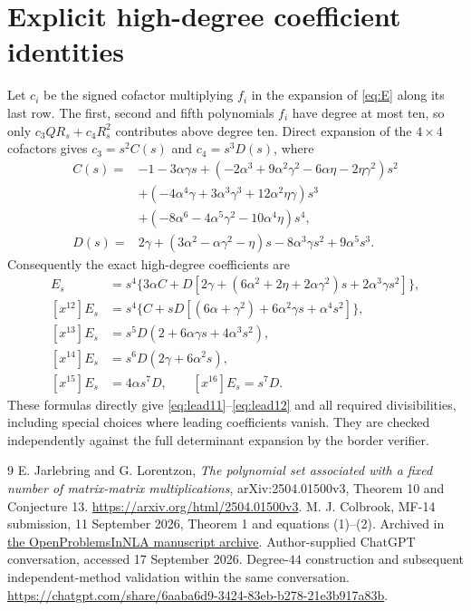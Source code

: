 \documentclass[11pt]{article}
\begin{document}
\section{Explicit high-degree coefficient identities}\label{app:cofactors}
Let $c_i$ be the signed cofactor multiplying $f_i$ in the expansion of
\eqref{eq:E} along its last row. The first, second and fifth polynomials
$f_i$ have degree at most ten, so only $c_3QR_s+c_4R_s^2$ contributes
above degree ten. Direct expansion of the $4\times4$ cofactors gives
$c_3=s^2 C(s)$ and $c_4=s^3 D(s)$, where
\begin{align*}
 C(s)={}&-1-3\alpha\gamma s
 +(-2\alpha^3+9\alpha^2\gamma^2-6\alpha\eta-2\eta\gamma^2)s^2\\
 &+(-4\alpha^4\gamma+3\alpha^3\gamma^3+12\alpha^2\eta\gamma)s^3\\
 &+(-8\alpha^6-4\alpha^5\gamma^2-10\alpha^4\eta)s^4,\\
 D(s)={}&2\gamma+(3\alpha^2-\alpha\gamma^2-\eta)s
             -8\alpha^3\gamma s^2+9\alpha^5s^3.
\end{align*}
Consequently the exact high-degree coefficients are
\begin{align*}
 [x^{11}]E_s&=s^4\{3\alpha C+D[2\gamma+
        (6\alpha^2+2\eta+2\alpha\gamma^2)s+2\alpha^3\gamma s^2]\},\\
 [x^{12}]E_s&=s^4\{C+sD[(6\alpha+\gamma^2)+6\alpha^2\gamma s+\alpha^4s^2]\},\\
 [x^{13}]E_s&=s^5D(2+6\alpha\gamma s+4\alpha^3s^2),\\
 [x^{14}]E_s&=s^6D(2\gamma+6\alpha^2s),\\
 [x^{15}]E_s&=4\alpha s^7D,\qquad [x^{16}]E_s=s^7D.
\end{align*}
These formulas directly give \eqref{eq:lead11}--\eqref{eq:lead12} and all
required divisibilities, including special choices where leading coefficients
vanish. They are checked independently against the full determinant expansion
by the border verifier.

\begin{thebibliography}{9}
 E. Jarlebring and G. Lorentzon,
\emph{The polynomial set associated with a fixed number of matrix-matrix
multiplications}, arXiv:2504.01500v3, Theorem 10 and Conjecture 13.
\url{https://arxiv.org/html/2504.01500v3}.
 M. J. Colbrook, MF-14 submission, 11 September 2026,
Theorem 1 and equations (1)--(2). Archived in
\href{https://github.com/ajt60gaibb/OpenProblemsInNLA/blob/main/references/colbrook-matrix-functions-2026-09-11/manuscripts/MF-14.tex}{the OpenProblemsInNLA manuscript archive}.
 Author-supplied ChatGPT conversation, accessed 17 September
2026. Degree-$44$ construction and subsequent independent-method validation
within the same conversation.
\url{https://chatgpt.com/share/6aaba6d9-3424-83eb-b278-21e3b917a83b}.
\end{thebibliography}
\end{document}
